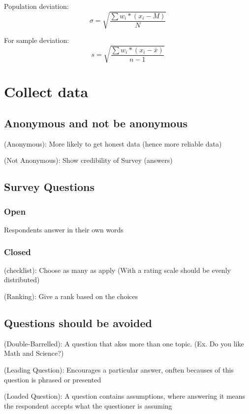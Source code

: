 Population deviation:
\begin{equation}
    \sigma = \sqrt{\frac{\sum w_i * (x_i - M)}{N}}
\end{equation}

For sample deviation:
\begin{equation}
    s = \sqrt{\frac{\sum w_i * (x_i - \bar{x})}{n - 1}}
\end{equation}

\section{Collect data}
\subsection{Anonymous and not be anonymous}
\begin{definition}
    (Anonymous): More likely to get honest data (hence more reliable data)
\end{definition}
\begin{definition}
    (Not Anonymous): Show credibility of Survey (answers)
\end{definition}

\subsection{Survey Questions}
\subsubsection*{Open}
Respondents answer in their own words

\subsubsection*{Closed}
\begin{definition}
    (checklist): Choose as many as apply (With a rating scale should be evenly distributed)
\end{definition}
\begin{definition}
    (Ranking): Give a rank based on the choices
\end{definition}

\subsection{Questions should be avoided}
\begin{definition}
    (Double-Barrelled): A question that akss more than one topic. (Ex. Do you like Math and Science?)
\end{definition}
\begin{definition}
    (Leading Question): Encourages a particular answer, onften becauses of this question is phrased or presented
\end{definition}
\begin{definition}
    (Loaded Question): A question contains assumptions, where answering it means the respondent accepts what the questioner is assuming
\end{definition}

